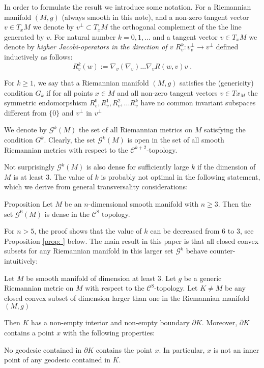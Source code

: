 \documentclass[a4paper,10pt]{article}
\begin{document}
In order to formulate the result we introduce some notation.   For a Riemannian manifold $(M,g)$ (always smooth in this note), and
a non-zero tangent vector $v\in T_xM$ we denote by $v^{\perp} \subset T_xM$ the orthogonal complement of the the line generated by $v$.
For natural number $k=0,1,...$  and a 
tangent vector $v\in T _xM$ we denote by \emph{higher Jacobi-operators in the direction of $v$} $R^k _v :v^{\perp}_v\to v^{\perp}$ defined inductively  as follows:  
$$R^k _v(w):=  \nabla _v (\nabla _v)...\nabla_v R (w,v)v \;.$$ 

  For $k\geq 1$, we say that a Riemannian manifold $(M,g)$ satisfies the (genericity) condition
$G_k$ if   for all points $x\in M$ and all non-zero tangent vectors $v\in Tx_M$ the symmetric endomorpshism
$R^0 _v, R^1_v, R^2 _v,...R^k_v$ have no common invariant subspaces different from $\{0\}$ and $v^{\perp}$ in $v^{\perp}$

We denote by $\mathcal G^k (M)$ the set of all Riemannian metrics on $M$ satisfying the condition $G^k$.
Clearly, the set $\mathcal G^k (M)$ is open in the set of all smooth Riemannian metrics with respect to the 
$\mathcal C^{k+2}$-topology.

 Not surprisingly $\mathcal G^k (M)$ is also dense for sufficiently large $k$ if the dimension of $M$ is at least $3$.
The value of $k$ is probably not optimal in the following statement, which we derive from general transversality considerations:

\begin{thm}{Proposition}
Let $M$ be an $n$-dimensional smooth manifold with $n\geq 3$.  Then the set $\mathcal G^6 (M)$ is dense in the 
$\mathcal C^{8}$ topology.  
\end{thm}

For $n>5$, the proof shows that  the value of $k$  can be decreased from $6$ to $3$, see Proposition \ref{prop:  } below. 
The main result in this paper is that all closed convex subsets for any Riemannian manifold in this larger set $\mathcal G^k$
behave counter-intuitively:


\begin{thm} \label{thm: main}
  Let $M$ be smooth   manifold of dimension at least $3$.  
		Let $g$ be  a generic  Riemannian metric on $M$ with respect to 
  the $\mathcal C^8$-topology.  Let $K\neq M$ be any closed convex subset of dimension larger than one in  the Riemannian manifold $(M,g)$
  
Then  $K$
has  a non-empty interior and non-empty boundary $\partial K$.  Moreover, $\partial K$ contains a point $x$ with the following properties: 

 No geodesic contained in $\partial K$ contains the point $x$. In particular,  $x$ is not   an inner  point of any geodesic contained in $K$. 
 \end{thm} 
\end{document}
